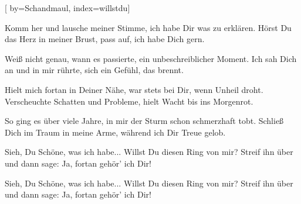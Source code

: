 
[%
    by={Schandmaul},
    index={willstdu}]


    \label{willstdu}

    \beginverse
        Komm her und lausche meiner Stimme,
        ich habe Dir was zu erkl\"{a}ren.
        H\"{o}rst Du das Herz in meiner Brust,
        pass auf, ich habe Dich gern.
    \endverse

    \beginverse
        Wei\ss{} nicht genau, wann es passierte,
        ein unbeschreiblicher Moment.
        Ich sah Dich an und in mir r\"{u}hrte,
        sich ein Gef\"{u}hl, das brennt.
    \endverse

    \beginverse
        Hielt mich fortan in Deiner N\"{a}he,
        war stets bei Dir, wenn Unheil droht.
        Verscheuchte Schatten und Probleme,
        hielt Wacht bis ins Morgenrot.
    \endverse

    \beginverse
        So ging es \"{u}ber viele Jahre,
        in mir der Sturm schon schmerzhaft tobt.
        Schlie\ss{} Dich im Traum in meine Arme,
        w\"{a}hrend ich Dir Treue gelob.
    \endverse

    \beginchorus
        Sieh, Du Sch\"{o}ne, was ich habe...
        Willst Du diesen Ring von mir?
        Streif ihn \"{u}ber und dann sage:
        Ja, fortan geh\"{o}r' ich Dir!
    \endchorus

    \beginverse*
    \endverse

    \beginchorus
        Sieh, Du Sch\"{o}ne, was ich habe...
        Willst Du diesen Ring von mir?
        Streif ihn \"{u}ber und dann sage:
        Ja, fortan geh\"{o}r' ich Dir!
    \endchorus
\endsong
